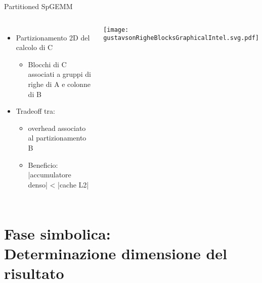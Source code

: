 \begin{frame} {Partitioned SpGEMM}
\begin{columns}
	\begin{itemize}
		\item	Partizionamento 2D del calcolo di C
		\begin{itemize}
			\item	Blocchi di C associati a gruppi di righe di A e colonne di B
		\end{itemize}
		\pause
		\item	Tradeoff tra:
		\begin{itemize}
			\item	overhead associato al partizionamento B 
			\item	Beneficio: |accumulatore denso| < |cache L2|
		\end{itemize}
	\end{itemize}
	\texttt{[image: gustavsonRigheBlocksGraphicalIntel.svg.pdf]}
\end{columns}
\end{frame}

\section{Fase simbolica:\\Determinazione dimensione del risultato}

